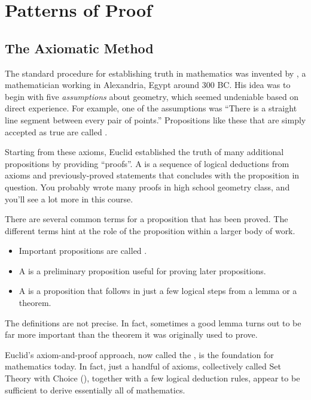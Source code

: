 \chapter{Patterns of Proof}\label{templates_chap}

\section{The Axiomatic Method}

The standard procedure for establishing truth in mathematics was
invented by , a mathematician working in Alexandria, Egypt
around 300 BC.  His idea was to begin with five \textit{assumptions}
about geometry, which seemed undeniable based on direct experience.
For example, one of the assumptions was ``There is a straight line
segment between every pair of points.''  Propositions like these that
are simply accepted as true are called .

Starting from these axioms, Euclid established the truth of many
additional propositions by providing ``proofs''.  A  is a
sequence of logical deductions from axioms and previously-proved
statements that concludes with the proposition in question.  You
probably wrote many proofs in high school geometry class, and you'll
see a lot more in this course.

There are several common terms for a proposition that has been proved.
The different terms hint at the role of the proposition within a
larger body of work.
%
\begin{itemize}
\item Important propositions are called .
\item A  is a preliminary proposition useful for proving
later propositions.
\item A  is a proposition that follows
in just a few logical steps from a lemma or a theorem.  
\end{itemize}
%
The definitions are not precise.  In fact, sometimes a good lemma
turns out to be far more important than the theorem it was originally
used to prove.

Euclid's axiom-and-proof approach, now called the , is the foundation for mathematics today.  In fact, just a
handful of axioms, collectively called  Set
Theory with Choice (), together with a few logical deduction
rules, appear to be sufficient to derive essentially all of
mathematics.

